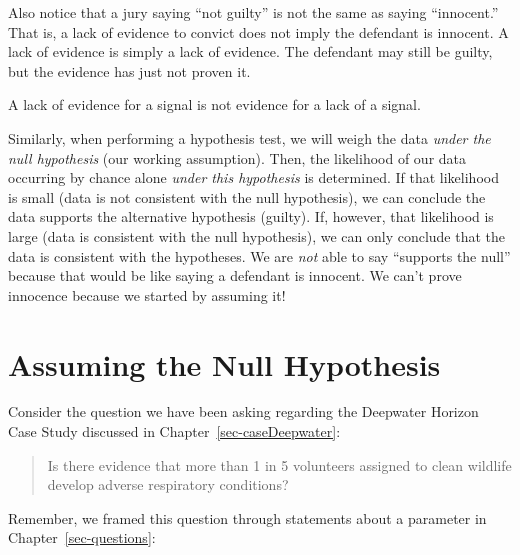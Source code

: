\documentclass[
  letterpaper,
  DIV=11,
  numbers=noendperiod]{scrreprt}
\theoremstyle{definition}
\theoremstyle{definition}
\theoremstyle{plain}
\theoremstyle{remark}
\begin{document}
Also notice that a jury saying ``not guilty'' is not the same as saying
``innocent.'' That is, a lack of evidence to convict does not imply the
defendant is innocent. A lack of evidence is simply a lack of evidence.
The defendant may still be guilty, but the evidence has just not proven
it.

\begin{tcolorbox}[enhanced jigsaw, colbacktitle=quarto-callout-tip-color!10!white, colback=white, left=2mm, title=\textcolor{quarto-callout-tip-color}{\faLightbulb}\hspace{0.5em}{Big Idea}, toptitle=1mm, leftrule=.75mm, breakable, bottomrule=.15mm, arc=.35mm, rightrule=.15mm, toprule=.15mm, coltitle=black, opacityback=0, colframe=quarto-callout-tip-color-frame, opacitybacktitle=0.6, bottomtitle=1mm, titlerule=0mm]

A lack of evidence for a signal is not evidence for a lack of a signal.

\end{tcolorbox}

Similarly, when performing a hypothesis test, we will weigh the data
\emph{under the null hypothesis} (our working assumption). Then, the
likelihood of our data occurring by chance alone \emph{under this
hypothesis} is determined. If that likelihood is small (data is not
consistent with the null hypothesis), we can conclude the data supports
the alternative hypothesis (guilty). If, however, that likelihood is
large (data is consistent with the null hypothesis), we can only
conclude that the data is consistent with the hypotheses. We are
\emph{not} able to say ``supports the null'' because that would be like
saying a defendant is innocent. We can't prove innocence because we
started by assuming it!

\section{Assuming the Null
Hypothesis}\label{assuming-the-null-hypothesis}

Consider the question we have been asking regarding the Deepwater
Horizon Case Study discussed in Chapter~\ref{sec-caseDeepwater}:

\begin{quote}
Is there evidence that more than 1 in 5 volunteers assigned to clean
wildlife develop adverse respiratory conditions?
\end{quote}

Remember, we framed this question through statements about a parameter
in Chapter~\ref{sec-questions}:
\end{document}
